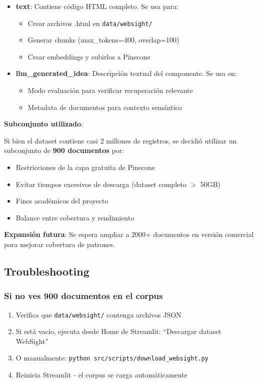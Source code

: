 \documentclass[12pt,a4paper]{article}
\begin{document}
\begin{itemize}
    \item \textbf{text}: Contiene código HTML completo. Se usa para:
    \begin{itemize}
        \item Crear archivos .html en \texttt{data/websight/}
        \item Generar chunks (max\_tokens=400, overlap=100)
        \item Crear embeddings y subirlos a Pinecone
    \end{itemize}
    
    \item \textbf{llm\_generated\_idea}: Descripción textual del componente. Se usa en:
    \begin{itemize}
        \item Modo evaluación para verificar recuperación relevante
        \item Metadata de documentos para contexto semántico
    \end{itemize}
\end{itemize}

\textbf{Subconjunto utilizado}:

Si bien el dataset contiene casi 2 millones de registros, se decidió utilizar un subconjunto de \textbf{900 documentos} por:

\begin{itemize}
    \item Restricciones de la capa gratuita de Pinecone
    \item Evitar tiempos excesivos de descarga (dataset completo $>$ 50GB)
    \item Fines académicos del proyecto
    \item Balance entre cobertura y rendimiento
\end{itemize}

\textbf{Expansión futura}: Se espera ampliar a 2000+ documentos en versión comercial para mejorar cobertura de patrones.

\subsection{Troubleshooting}

\subsubsection{Si no ves 900 documentos en el corpus}

\begin{enumerate}
    \item Verifica que \texttt{data/websight/} contenga archivos JSON
    \item Si está vacío, ejecuta desde Home de Streamlit: ``Descargar dataset WebSight''
    \item O manualmente: \texttt{python src/scripts/download\_websight.py}
    \item Reinicia Streamlit - el corpus se carga automáticamente
\end{enumerate}
\end{document}
